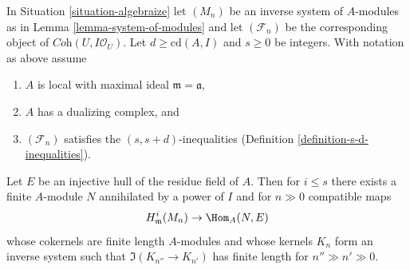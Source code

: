 \begin{lemma}
\label{lemma-helper-algebraize}
In Situation \ref{situation-algebraize} let $(M_n)$ be an inverse system of
$A$-modules as in Lemma \ref{lemma-system-of-modules} and let
$(\mathcal{F}_n)$ be the corresponding object of
$\textit{Coh}(U, I\mathcal{O}_U)$. Let $d \geq \text{cd}(A, I)$
and $s \geq 0$ be integers.
With notation as above assume
\begin{enumerate}
\item $A$ is local with maximal ideal $\mathfrak m = \mathfrak a$,
\item $A$ has a dualizing complex, and
\item $(\mathcal{F}_n)$ satisfies the $(s, s + d)$-inequalities
(Definition \ref{definition-s-d-inequalities}).
\end{enumerate}
Let $E$ be an injective hull of the residue field of $A$. Then for $i \leq s$
there exists a finite $A$-module $N$ annihilated by a power
of $I$ and for $n \gg 0$ compatible maps
$$
H^i_\mathfrak m(M_n) \to \Hom_A(N, E)
$$
whose cokernels are finite length $A$-modules and whose kernels $K_n$
form an inverse system such that $\Im(K_{n''} \to K_{n'})$ has finite
length for $n'' \gg n' \gg 0$.
\end{lemma}

